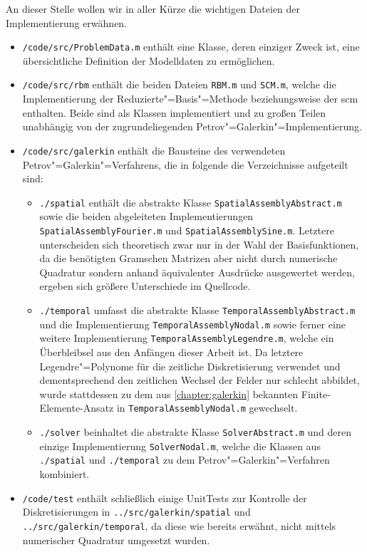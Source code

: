 \documentclass[../main.tex]{subfiles}
\begin{document}
An dieser Stelle wollen wir in aller Kürze die wichtigen Dateien der Implementierung erwähnen.
\begin{itemize}[leftmargin=1.5em]
    \item \verb!/code/src/ProblemData.m! enthält eine Klasse, deren einziger Zweck ist, eine übersichtliche Definition der Modelldaten zu ermöglichen.
    \item \verb!/code/src/rbm! enthält die beiden Dateien \verb!RBM.m! und \verb!SCM.m!, welche die Implementierung der Reduzierte"=Basis"=Methode beziehungsweise der \acl{scm} enthalten.
    Beide sind als Klassen implementiert und zu großen Teilen unabhängig von der zugrundeliegenden Petrov"=Galerkin"=Implementierung.
    \item \verb!/code/src/galerkin! enthält die Bausteine des verwendeten Petrov"=Galerkin"=Verfahrens, die in folgende die Verzeichnisse aufgeteilt sind:
    \begin{itemize}[leftmargin=1.5em]
        \item \verb!./spatial! enthält die abstrakte Klasse \verb!SpatialAssemblyAbstract.m! sowie die beiden abgeleiteten Implementierungen \verb!SpatialAssemblyFourier.m! und \verb!SpatialAssemblySine.m!.
        Letztere unterscheiden sich theoretisch zwar nur in der Wahl der Basisfunktionen, da die benötigten Gramschen Matrizen aber nicht durch numerische Quadratur sondern anhand äquivalenter Ausdrücke ausgewertet werden, ergeben sich größere Unterschiede im Quellcode.
        \item \verb!./temporal! umfasst die abstrakte Klasse \verb!TemporalAssemblyAbstract.m! und die Implementierung \verb!TemporalAssemblyNodal.m! sowie ferner eine weitere Implementierung \verb!TemporalAssemblyLegendre.m!, welche ein Überbleibsel aus den Anfängen dieser Arbeit ist.
        Da letztere Legendre"=Polynome für die zeitliche Diskretisierung verwendet und dementsprechend den zeitlichen Wechsel der Felder nur schlecht abbildet, wurde stattdessen zu dem aus \cref{chapter:galerkin} bekannten Finite-Elemente-Ansatz in \verb!TemporalAssemblyNodal.m! gewechselt.
        \item \verb!./solver! beinhaltet die abstrakte Klasse \verb!SolverAbstract.m! und deren einzige Implementierung \verb!SolverNodal.m!, welche die Klassen aus \verb!./spatial! und \verb!./temporal! zu dem Petrov"=Galerkin"=Verfahren kombiniert.
    \end{itemize}
    \item \verb!/code/test! enthält schließlich einige UnitTests zur Kontrolle der Diskretisierungen in \verb!../src/galerkin/spatial! und \verb!../src/galerkin/temporal!, da diese wie bereits erwähnt, nicht mittels numerischer Quadratur umgesetzt wurden.
\end{itemize}
\end{document}

